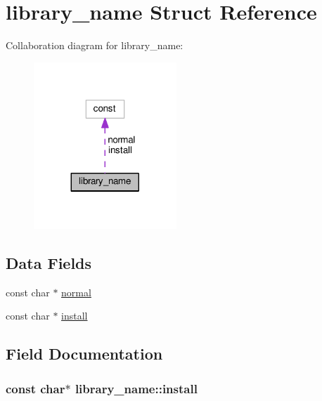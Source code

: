 \hypertarget{structlibrary__name}{}\section{library\+\_\+name Struct Reference}
\label{structlibrary__name}


Collaboration diagram for library\+\_\+name\+:
\nopagebreak
\begin{figure}[H]
\begin{center}
\leavevmode
\includegraphics[width=152pt]{structlibrary__name__coll__graph}
\end{center}
\end{figure}
\subsection*{Data Fields}
\begin{DoxyCompactItemize}
\item 
const char $\ast$ \hyperlink{structlibrary__name_adcb558772c92c93af0ec6ab6535c73d9}{normal}
\item 
const char $\ast$ \hyperlink{structlibrary__name_af62aa6c40add90f91fa309c2cc0008f2}{install}
\end{DoxyCompactItemize}


\subsection{Field Documentation}
\subsubsection[{\texorpdfstring{install}{install}}]{\setlength{\rightskip}{0pt plus 5cm}const char$\ast$ library\+\_\+name\+::install}\hypertarget{structlibrary__name_af62aa6c40add90f91fa309c2cc0008f2}{}\label{structlibrary__name_af62aa6c40add90f91fa309c2cc0008f2}
